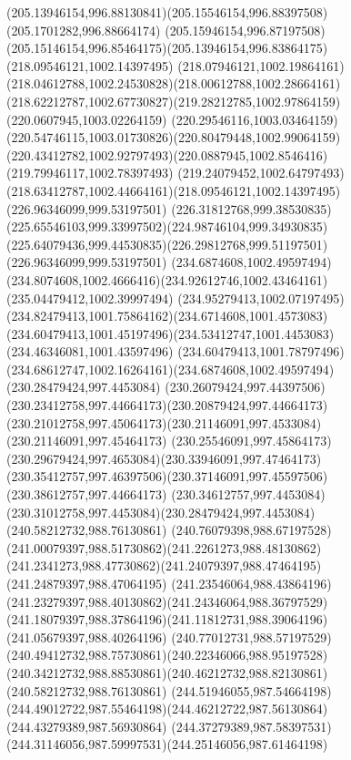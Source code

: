 {{  \curveto(205.13946154,996.88130841)(205.15546154,996.88397508)(205.1701282,996.88664174)
  \curveto(205.15946154,996.87197508)(205.15146154,996.85464175)(205.13946154,996.83864175)
  \moveto(218.09546121,1002.14397495)
  \curveto(218.07946121,1002.19864161)(218.04612788,1002.24530828)(218.00612788,1002.28664161)
  \curveto(218.62212787,1002.67730827)(219.28212785,1002.97864159)(220.0607945,1003.02264159)
  \curveto(220.29546116,1003.03464159)(220.54746115,1003.01730826)(220.80479448,1002.99064159)
  \curveto(220.43412782,1002.92797493)(220.0887945,1002.8546416)(219.79946117,1002.78397493)
  \curveto(219.24079452,1002.64797493)(218.63412787,1002.44664161)(218.09546121,1002.14397495)
  \moveto(226.96346099,999.53197501)
  \curveto(226.31812768,999.38530835)(225.65546103,999.33997502)(224.98746104,999.34930835)
  \curveto(225.64079436,999.44530835)(226.29812768,999.51197501)(226.96346099,999.53197501)
  \moveto(234.6874608,1002.49597494)
  \curveto(234.8074608,1002.4666416)(234.92612746,1002.43464161)(235.04479412,1002.39997494)
  \curveto(234.95279413,1002.07197495)(234.82479413,1001.75864162)(234.6714608,1001.4573083)
  \curveto(234.60479413,1001.45197496)(234.53412747,1001.4453083)(234.46346081,1001.43597496)
  \curveto(234.60479413,1001.78797496)(234.68612747,1002.16264161)(234.6874608,1002.49597494)
  \moveto(230.28479424,997.4453084)
  \curveto(230.26079424,997.44397506)(230.23412758,997.44664173)(230.20879424,997.44664173)
  \curveto(230.21012758,997.45064173)(230.21146091,997.4533084)(230.21146091,997.45464173)
  \curveto(230.25546091,997.45864173)(230.29679424,997.4653084)(230.33946091,997.47464173)
  \curveto(230.35412757,997.46397506)(230.37146091,997.45597506)(230.38612757,997.44664173)
  \curveto(230.34612757,997.4453084)(230.31012758,997.4453084)(230.28479424,997.4453084)
  \moveto(240.58212732,988.76130861)
  \curveto(240.76079398,988.67197528)(241.00079397,988.51730862)(241.2261273,988.48130862)
  \curveto(241.2341273,988.47730862)(241.24079397,988.47464195)(241.24879397,988.47064195)
  \curveto(241.23546064,988.43864196)(241.23279397,988.40130862)(241.24346064,988.36797529)
  \curveto(241.18079397,988.37864196)(241.11812731,988.39064196)(241.05679397,988.40264196)
  \curveto(240.77012731,988.57197529)(240.49412732,988.75730861)(240.22346066,988.95197528)
  \curveto(240.34212732,988.88530861)(240.46212732,988.82130861)(240.58212732,988.76130861)
  \moveto(244.51946055,987.54664198)
  \curveto(244.49012722,987.55464198)(244.46212722,987.56130864)(244.43279389,987.56930864)
  \curveto(244.37279389,987.58397531)(244.31146056,987.59997531)(244.25146056,987.61464198)
}}
